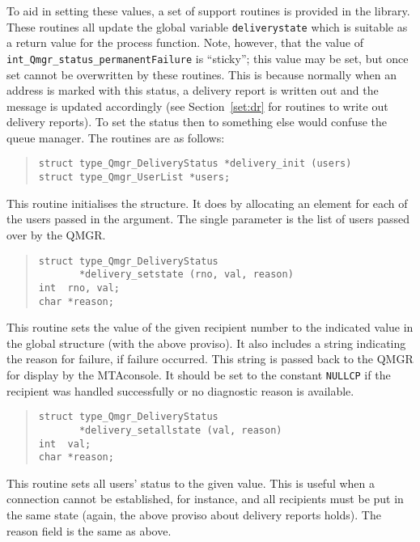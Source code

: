 To aid in setting these values, a set of support routines is provided
in the library. These routines all update the global variable
\verb|deliverystate| which is suitable as a return value for the
process function. Note, however, that the value of
\verb|int_Qmgr_status_permanentFailure| is ``sticky''; this value may
be set, but once set cannot be overwritten by these routines. This is
because normally when an address is marked with this status, a
delivery report is written out and the message is updated accordingly
(see Section~\ref{set:dr} for routines to write out delivery reports).
To  set the status  then to something else would confuse the queue
manager. The routines are as follows:

\begin{quote}\begin{verbatim}
struct type_Qmgr_DeliveryStatus *delivery_init (users)
struct type_Qmgr_UserList *users;
\end{verbatim}\end{quote}

This routine initialises the structure. It does by allocating an
element for each of the users passed in the argument. The single
parameter is the list of users passed over by the QMGR.

\begin{quote}\begin{verbatim}
struct type_Qmgr_DeliveryStatus 
       *delivery_setstate (rno, val, reason)
int  rno, val;
char *reason;
\end{verbatim}\end{quote}

This routine sets the value of the given recipient number to the
indicated value in the global structure (with the above proviso). It
also includes a string indicating the reason for failure, if failure
occurred. This string is passed back to the QMGR for display by
the MTAconsole. It should be set to the constant \verb|NULLCP|
if the recipient was handled successfully or no diagnostic reason is available.

\begin{quote}\begin{verbatim}
struct type_Qmgr_DeliveryStatus 
       *delivery_setallstate (val, reason)
int  val;
char *reason;
\end{verbatim}\end{quote}

This routine sets all users' status to the given value. This is useful
when a connection cannot be established, for instance, and all recipients
must be put in the same state (again, the above proviso about delivery
reports holds). The reason field is the same as above.

